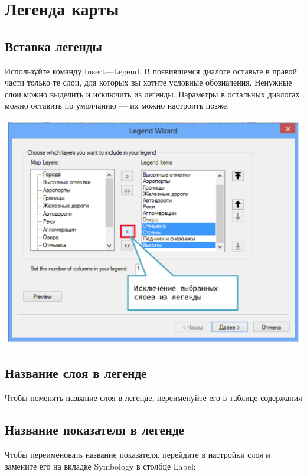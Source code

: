 \documentclass[]{book}
\theoremstyle{definition}
\theoremstyle{definition}
\theoremstyle{definition}
\theoremstyle{remark}
\begin{document}
\hypertarget{manual-legend}{%
\chapter{Легенда карты}\label{manual-legend}}

\hypertarget{-}{%
\section{Вставка легенды}\label{-}}

Используйте команду Insert---Legend. В появившемся диалоге оставьте в
правой части только те слои, для которых вы хотите условные обозначения.
Ненужные слои можно выделить и исключить из легенды. Параметры в
остальных диалогах можно оставить по умолчанию --- их можно настроить
позже.

\includegraphics{images/Appendix/image57.png}

\hypertarget{---}{%
\section{Название слоя в легенде}\label{---}}

Чтобы поменять название слоя в легенде, переименуйте его в таблице
содержания

\hypertarget{---}{%
\section{Название показателя в легенде}\label{---}}

Чтобы переименовать название показателя, перейдите в настройки слоя и
замените его на вкладке Symbology в столбце Label:
\end{document}
